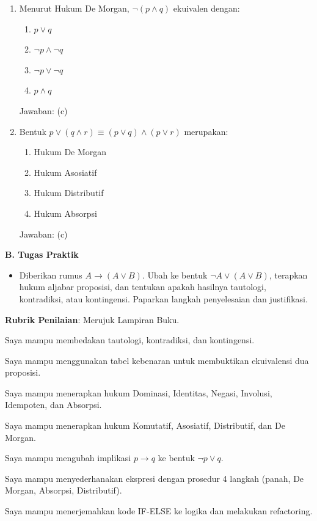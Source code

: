 \documentclass[../main]{subfiles}
\begin{document}
\begin{asesmen}
\begin{enumerate}
  \item Menurut Hukum De Morgan, $\neg(p \wedge q)$ ekuivalen dengan:
  \begin{enumerate}
    \item $p \vee q$
    \item $\neg p \wedge \neg q$
    \item $\neg p \vee \neg q$
    \item $p \wedge q$
  \end{enumerate}
  Jawaban: (c)

  \item Bentuk $p \vee (q \wedge r) \equiv (p \vee q) \wedge (p \vee r)$ merupakan:
  \begin{enumerate}
    \item Hukum De Morgan
    \item Hukum Asosiatif
    \item Hukum Distributif
    \item Hukum Absorpsi
  \end{enumerate}
  Jawaban: (c)
\end{enumerate}

\textbf{B. Tugas Praktik}
\begin{itemize}
  \item Diberikan rumus $A \rightarrow (A \vee B)$. Ubah ke bentuk $\neg A \vee (A \vee B)$, terapkan hukum aljabar proposisi, dan tentukan apakah hasilnya tautologi, kontradiksi, atau kontingensi. Paparkan langkah penyelesaian dan justifikasi.
\end{itemize}

\textbf{Rubrik Penilaian}: Merujuk Lampiran Buku.
\end{asesmen}


\begin{checklist}
  \item Saya mampu membedakan tautologi, kontradiksi, dan kontingensi.
  \item Saya mampu menggunakan tabel kebenaran untuk membuktikan ekuivalensi dua proposisi.
  \item Saya mampu menerapkan hukum Dominasi, Identitas, Negasi, Involusi, Idempoten, dan Absorpsi.
  \item Saya mampu menerapkan hukum Komutatif, Asosiatif, Distributif, dan De Morgan.
  \item Saya mampu mengubah implikasi $p \rightarrow q$ ke bentuk $\neg p \vee q$.
  \item Saya mampu menyederhanakan ekspresi dengan prosedur 4 langkah (panah, De Morgan, Absorpsi, Distributif).
  \item Saya mampu menerjemahkan kode IF-ELSE ke logika dan melakukan refactoring.
\end{checklist}
\end{document}
